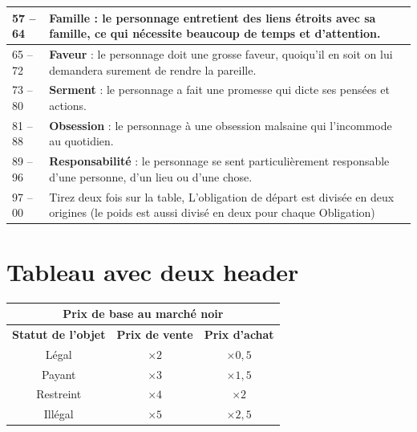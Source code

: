 \documentclass{article}
\begin{document}
\begin{center}
\begin{tabular}{|p{4.5cm}|p{12cm}|}
		\hline 
		57 -- 64 & \textbf{Famille} : le personnage entretient des liens étroits avec sa famille, ce qui nécessite beaucoup de temps et d'attention. \\
		\hline 
		65 -- 72 & \textbf{Faveur} : le personnage doit une grosse faveur, quoiqu'il en soit on lui demandera surement de rendre la pareille. \\
		\hline 
		73 -- 80 & \textbf{Serment} : le personnage a fait une promesse qui dicte ses pensées et actions. \\
		\hline 
		81 -- 88 & \textbf{Obsession} : le personnage à une obsession malsaine qui l'incommode au quotidien. \\
		\hline 
		89 -- 96 & \textbf{Responsabilité} : le personnage se sent particulièrement responsable d'une personne, d'un lieu ou d'une chose. \\
		\hline 
		97 -- 00 & Tirez deux fois sur la table, L'obligation de départ est divisée en deux origines (le poids est aussi divisé en deux pour chaque Obligation) \\
		\hline 
	\end{tabular}
\end{center}

\section*{Tableau avec deux header}
\begin{tabular}{|c|c|c|}
	\hline 
	\multicolumn{3}{|c|}{\cellcolor{DarkRed} \textbf{{\large \textcolor{PureWhite}{Prix de base au marché noir}}}} \\ 
	\hline 
	\cellcolor{DarkGold}\textbf{Statut de l'objet} & \cellcolor{DarkGold}\textbf{Prix de vente} & \cellcolor{DarkGold}\textbf{Prix d'achat} \\ 
	\hline 
	Légal & $\times2$ & $\times0,5$ \\ 
	\hline 
	Payant & $\times3$ & $\times1,5$ \\ 
	\hline 
	Restreint & $\times4$ & $\times2$ \\ 
	\hline 
	Illégal & $\times5$ & $\times2,5$ \\ 
	\hline 
\end{tabular}
\end{document}
